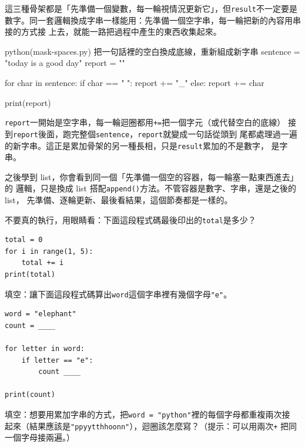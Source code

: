 這三種骨架都是「先準備一個變數，每一輪視情況更新它」，但\texttt{result}不一定要是
數字。同一套邏輯換成字串一樣能用：先準備一個空字串，每一輪把新的內容用串接的方式接
上去，就能一路把過程中產生的東西收集起來。

\begin{example}{python}{(mask-spaces.py) 把一句話裡的空白換成底線，重新組成新字串}
sentence = "today is a good day"
report = ""

for char in sentence:
    if char == " ":
        report += "_"
    else:
        report += char

print(report)
\end{example}


\texttt{report}一開始是空字串，每一輪迴圈都用\texttt{+=}把一個字元（或代替空白的底線）
接到\texttt{report}後面，跑完整個\texttt{sentence}，\texttt{report}就變成一句話從頭到
尾都處理過一遍的新字串。這正是累加骨架的另一種長相，只是\texttt{result}累加的不是數字，
是字串。

之後學到 list，你會看到同一個「先準備一個空的容器，每一輪塞一點東西進去」的
邏輯，只是換成 list 搭配\texttt{append()}方法。不管容器是數字、字串，還是之後的 list，
先準備、逐輪更新、最後看結果，這個節奏都是一樣的。


\begin{drills}[label=drills:accumulate-count]
\item 不要真的執行，用眼睛看：下面這段程式碼最後印出的\texttt{total}是多少？
\begin{verbatim}
total = 0
for i in range(1, 5):
    total += i
print(total)
\end{verbatim}
\item 填空：讓下面這段程式碼算出\texttt{word}這個字串裡有幾個字母\texttt{"e"}。
\begin{verbatim}
word = "elephant"
count = ____

for letter in word:
    if letter == "e":
        count ____

print(count)
\end{verbatim}
\item 填空：想要用累加字串的方式，把\texttt{word = "python"}裡的每個字母都重複兩次接
起來（結果應該是\texttt{"ppyytthhoonn"}），迴圈該怎麼寫？（提示：可以用兩次\texttt{+}
把同一個字母接兩遍。）
\end{drills}

